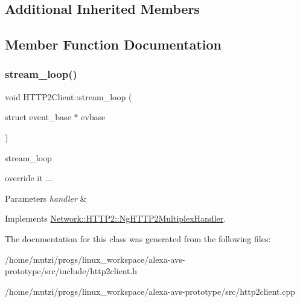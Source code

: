 \subsection*{Additional Inherited Members}


\subsection{Member Function Documentation}
\mbox{\label{classNetwork_1_1HTTP2_1_1HTTP2Client_a5c5cd10569102998104f2124a3c7a119}} 
\subsubsection{\texorpdfstring{stream\+\_\+loop()}{stream\_loop()}}
{\footnotesize\ttfamily void H\+T\+T\+P2\+Client\+::stream\+\_\+loop (\begin{DoxyParamCaption}\item[{struct event\+\_\+base $\ast$}]{evbase }\end{DoxyParamCaption})\hspace{0.3cm}{\ttfamily [virtual]}}



stream\+\_\+loop 

override it ... 
\begin{DoxyParams}{Parameters}
{\em handler} & \\
\hline
\end{DoxyParams}


Implements \hyperlink{classNetwork_1_1HTTP2_1_1NgHTTP2MultiplexHandler_a95e9df9737af24d79894320e8cb343de}{Network\+::\+H\+T\+T\+P2\+::\+Ng\+H\+T\+T\+P2\+Multiplex\+Handler}.



The documentation for this class was generated from the following files\+:\begin{DoxyCompactItemize}
\item 
/home/mutzi/progs/linux\+\_\+workspace/alexa-\/avs-\/prototype/src/include/http2client.\+h\item 
/home/mutzi/progs/linux\+\_\+workspace/alexa-\/avs-\/prototype/src/http2client.\+cpp\end{DoxyCompactItemize}
